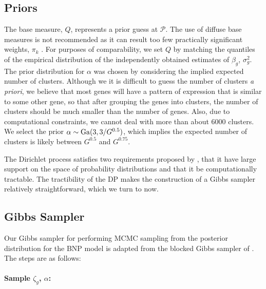 \subsection{Priors}
The base measure, $Q$, represents a prior guess at $\mathcal{P}$. The use of diffuse base measures is not recommended as it can result too few practically significant weights, $\pi_k$ \citep[p.554]{gelman-book}. For purposes of comparability, we set $Q$ by matching the quantiles of the empirical distribution of the independently obtained estimates of $\beta_g$, $\sigma_g^2$. The prior distribution for $\alpha$ was chosen by considering the implied expected number of clusters. Although we it is difficult to guess the number of clusters \textit{a priori}, we believe that most genes will have a pattern of expression that is similar to some other gene, so that after grouping the genes into clusters, the number of clusters should be much smaller than the number of genes. Also, due to computational constraints, we cannot deal with more than about 6000 clusters. We select the prior $\alpha \sim \operatorname{Ga}(3,3/G^{0.5})$, which implies the expected number of clusters is likely between $G^{0.5}$ and $G^{0.75}$.

The Dirichlet process satisfies two requirements proposed by \citet{ferguson}, that it have large support on the space of probability distributions and that it be computationally tractable. The tractibility of the DP makes the construction of a Gibbs sampler relatively straightforward, which we turn to now.

\subsection{Gibbs Sampler}
Our Gibbs sampler for performing MCMC sampling from the posterior distribution for the BNP model is adapted from the blocked Gibbs sampler of \citet{ishwaran2000}. The steps are as follows:

\paragraph{Sample $\zeta_g$, $\alpha$:}

